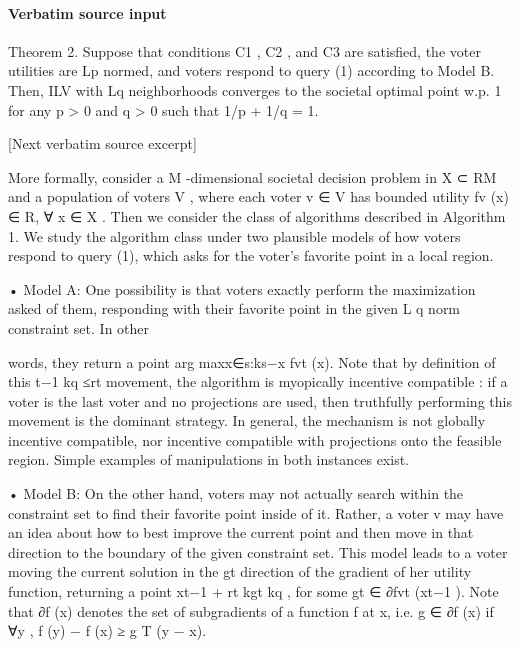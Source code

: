 \documentclass[10pt]{article}
\begin{document}
\paragraph{Verbatim source input}
\begin{ReviewVerbatim}
Theorem 2. Suppose that conditions C1 , C2 , and C3 are satisfied, the voter utilities are
Lp normed, and voters respond to query (1) according to Model B. Then, ILV with Lq
neighborhoods converges to the societal optimal point w.p. 1 for any p > 0 and q > 0 such
that 1/p + 1/q = 1.

[Next verbatim source excerpt]

   More formally, consider a M -dimensional societal decision problem in X  ⊂ RM and a
population of voters V , where each voter v ∈ V has bounded utility fv (x) ∈ R, ∀ x ∈ X .
Then we consider the class of algorithms described in Algorithm 1. We study the algorithm
class under two plausible models of how voters respond to query (1), which asks for the
voter's favorite point in a local region.



• Model A:       One possibility is that voters exactly perform the maximization asked of
  them, responding with their favorite point in the given L
                                                                       q norm constraint set. In other

  words, they return a point arg maxx∈{s:ks−x                    fvt (x). Note that by definition of this
                                                  t−1 kq ≤rt }
  movement, the algorithm is     myopically incentive compatible : if a voter is the last voter
  and no projections are used, then truthfully performing this movement is the dominant
  strategy.   In general, the mechanism is not globally incentive compatible, nor incentive
  compatible with projections onto the feasible region. Simple examples of manipulations
  in both instances exist.



• Model B:       On the other hand, voters may not actually search within the constraint set
  to find their favorite point inside of it. Rather, a voter v may have an idea about how
  to best improve the current point and then move in that direction to the boundary of
  the given constraint set. This model leads to a voter moving the current solution in the
                                                                                           gt
  direction of the gradient of her utility function, returning a point xt−1 + rt
                                                                                         kgt kq , for some
  gt ∈ ∂fvt (xt−1 ). Note that ∂f (x) denotes the set of subgradients of a function f at x, i.e.
  g ∈ ∂f (x) if ∀y , f (y) − f (x) ≥ g T (y − x).


\end{ReviewVerbatim}
\end{document}
